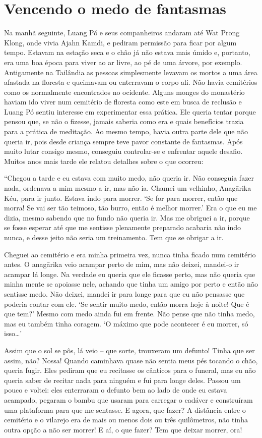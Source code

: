 \chapter{Vencendo o medo de fantasmas}

Na manhã seguinte, Luang Pó e seus companheiros andaram até Wat Prong
Klong, onde vivia Ajahn Kamdi, e pediram permissão para ficar por algum
tempo. Estavam na estação seca e o chão já não estava mais úmido e,
portanto, era uma boa época para viver ao ar livre, ao pé de uma árvore,
por exemplo. Antigamente na Tailândia as pessoas simplesmente levavam os
mortos a uma área afastada na floresta e queimavam ou enterravam o corpo
ali. Não havia cemitérios como os normalmente encontrados no ocidente.
Alguns monges do monastério haviam ido viver num cemitério de floresta
como este em busca de reclusão e Luang Pó sentiu interesse em
experimentar essa prática. Ele queria tentar porque pensou que, se não o
fizesse, jamais saberia como era e quais benefícios trazia para a
prática de meditação. Ao mesmo tempo, havia outra parte dele que não
queria ir, pois desde criança sempre teve pavor constante de fantasmas.
Após muito lutar consigo mesmo, conseguiu controlar-se e enfrentar
aquele desafio. Muitos anos mais tarde ele relatou detalhes sobre o que
ocorreu:

``Chegou a tarde e eu estava com muito medo, não queria ir. Não
conseguia fazer nada, ordenava a mim mesmo a ir, mas não ia. Chamei um
velhinho, Anagārika Kéu, para ir junto. Estava indo para morrer. `Se for
para morrer, então que morra! Se vai ser tão teimoso, tão burro, então é
melhor morrer.' Era o que eu me dizia, mesmo sabendo que no fundo não
queria ir. Mas me obriguei a ir, porque se fosse esperar até que me
sentisse plenamente preparado acabaria não indo nunca, e desse jeito não
seria um treinamento. Tem que se obrigar a ir.

Cheguei ao cemitério e era minha primeira vez, nunca tinha ficado num
cemitério antes. O anagārika veio acampar perto de mim, mas não deixei,
mandei-o ir acampar lá longe. Na verdade eu queria que ele ficasse
perto, mas não queria que minha mente se apoiasse nele, achando que
tinha um amigo por perto e então não sentisse medo. Não deixei, mandei
ir para longe para que eu não pensasse que poderia contar com ele. `Se
sentir muito medo, então morra hoje à noite! Que é que tem?' Mesmo com
medo ainda fui em frente. Não pense que não tinha medo, mas eu também
tinha coragem. `O máximo que pode acontecer é eu morrer, só
isso\ldots{}'

Assim que o sol se pôs, lá veio -- que sorte, trouxeram um defunto!
Tinha que ser assim, não? Nossa! Quando caminhava quase não sentia meus
pés tocando o chão, queria fugir. Eles pediram que eu recitasse os
cânticos para o funeral, mas eu não queria saber de recitar nada para
ninguém e fui para longe deles. Passou um pouco e voltei: eles
enterraram o defunto bem ao lado de onde eu estava acampado, pegaram o
bambu que usaram para carregar o cadáver e construíram uma plataforma
para que me sentasse. E agora, que fazer? A distância entre o cemitério
e o vilarejo era de mais ou menos dois ou três quilômetros, não tinha
outra opção a não ser morrer! E aí, o que fazer? Tem que deixar morrer,
ora!

